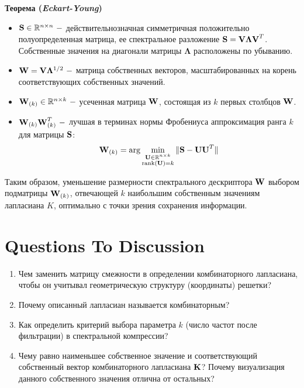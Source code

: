 \textbf{Теорема (\textit{Eckart-Young})}
\begin{itemize}
\item $\textbf{S} \in \mathbb{R}^{n \times n} ~- $ действительнозначная симметричная положительно полуопределенная матрица, ее спектральное разложение $\textbf{S} = \textbf{V}  \bm{\Lambda} \textbf{V}^T $. Собственные значения на диагонали матрицы $\bm{\Lambda}$ расположены по убыванию. 
\item $\textbf{W} = \textbf{V} \bm{\Lambda}^{1/2} ~-$ матрица собственных векторов, масштабированных на корень соответствующих собственных значений.
\item $\textbf{W}_{(k)} \in \mathbb{R}^{n \times k} ~- $ усеченная матрица $\textbf{W}$, состоящая из $k$ первых столбцов $\textbf{W}$.
\item $\textbf{W}_{(k)} \textbf{W}_{(k)}^T ~-$ лучшая в терминах нормы Фробениуса аппроксимация ранга $k$ для матрицы $\textbf{S}$:
$$\textbf{W}_{(k)} = \arg \min \limits _{\substack{\textbf{U} \in \mathbb{R}^{n \times k} \\ \text{rank}(\textbf{U})=k}} \| \textbf{S} - \textbf{U} \textbf{U}^T \|$$
\end{itemize}


Таким образом, уменьшение размерности спектрального дескриптора $\textbf{W}$ выбором подматрицы $\textbf{W}_{(k)}$, отвечающей $k$ наибольшим собственным значениям лапласиана $K$, оптимально с точки зрения сохранения информации.

\section{Questions To Discussion}
\begin{enumerate}
\item Чем заменить матрицу смежности в определении комбинаторного лапласиана, чтобы он учитывал геометрическую структуру (координаты) решетки?
\item Почему описанный лапласиан называется комбинаторным?
\item Как определить критерий выбора параметра $k$ (число частот после фильтрации) в спектральной компрессии? 
\item Чему равно наименьшее собственное значение и соответствующий собственный вектор комбинаторного лапласиана $\textbf{K}$? Почему визуализация данного собственного значения отлична от остальных?
\end{enumerate}